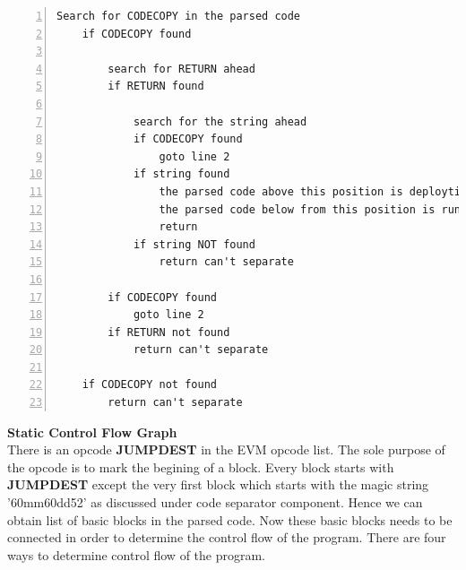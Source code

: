 \documentclass{article}
\begin{document}
\begin{Verbatim}[numbers=left,xleftmargin=5mm]
    Search for CODECOPY in the parsed code
    if CODECOPY found
    
        search for RETURN ahead
        if RETURN found
        
            search for the string ahead
            if CODECOPY found
                goto line 2
            if string found
                the parsed code above this position is deploytime bytecode
                the parsed code below from this position is runtime bytecode
                return
            if string NOT found
                return can't separate
                
        if CODECOPY found 
            goto line 2
        if RETURN not found
            return can't separate
            
    if CODECOPY not found
        return can't separate
\end{Verbatim}
\textbf{Static Control Flow Graph}\\
There is an opcode \textbf{JUMPDEST} in the EVM opcode list. The sole purpose of the opcode is to mark the begining of a block. Every block starts with \textbf{JUMPDEST} except the very first block which starts with the magic string '60mm60dd52' as discussed under code separator component. Hence we can obtain list of basic blocks in the parsed code. Now these basic blocks needs to be connected in order to determine the control flow of the program. There are four ways to determine control flow of the program.\\
\end{document}
